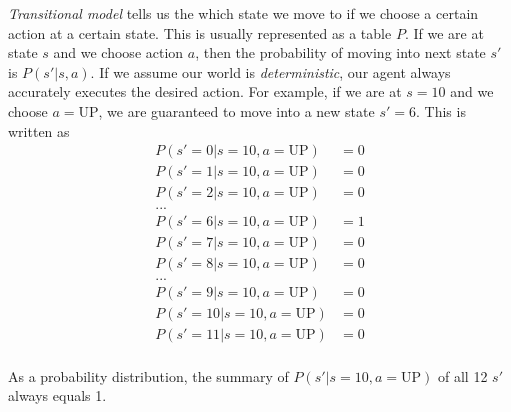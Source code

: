 \documentclass[
	letterpaper
]{article}
\begin{document}
\textit{Transitional model} tells us the which state we move to if we choose a certain action at a certain state. This is usually represented as a table $P$.
If we are at state $s$ and we choose action $a$, then the probability of moving into next state $s'$ is $P(s'| s, a)$.
If we assume our world is \textit{deterministic}, our agent always accurately executes the desired action.
For example, if we are at $s = 10$ and we choose $a = \text{UP}$, we are guaranteed to move into a new state $s' = 6$. 
This is written as
\begin{equation}
\begin{split}
P(s' = 0| s = 10, a = \text{UP}) &= 0\\
P(s' = 1| s = 10, a = \text{UP}) &= 0\\
P(s' = 2| s = 10, a = \text{UP}) &= 0\\
...&\\
P(s' = 6| s = 10, a = \text{UP}) &= 1\\
P(s' = 7| s = 10, a = \text{UP}) &= 0\\
P(s' = 8| s = 10, a = \text{UP}) &= 0\\
...&\\
P(s' = 9| s = 10, a = \text{UP}) &= 0\\
P(s' = 10| s = 10, a = \text{UP}) &= 0\\
P(s' = 11| s = 10, a = \text{UP}) &= 0\\
\end{split}
\end{equation}

As a probability distribution, the summary of  $P(s'| s = 10, a = \text{UP})$ of all 12 $s'$ always equals 1. 
\end{document}
